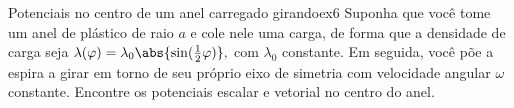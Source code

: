 \begin{exercício}{Potenciais no centro de um anel carregado girando}{ex6}
   Suponha que você tome um anel de plástico de raio \(a\) e cole nele uma carga, de forma que a densidade de carga seja \(\lambda(\varphi) = \lambda_0 \abs{\sin(\frac12 \varphi)},\) com \(\lambda_0\) constante. Em seguida, você põe a espira a girar em torno de seu próprio eixo de simetria com velocidade angular \(\omega\) constante. Encontre os potenciais escalar e vetorial no centro do anel.
\end{exercício}
